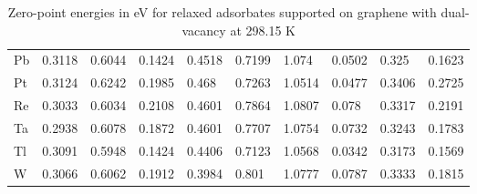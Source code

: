 \begin{table}[h]
{\begin{tabular}{*{10}{l}}
      Pb & 0.3118 & 0.6044 & 0.1424 & 0.4518 & 0.7199 & 1.074  & 0.0502 & 0.325  & 0.1623 \\
      Pt & 0.3124 & 0.6242 & 0.1985 & 0.468  & 0.7263 & 1.0514 & 0.0477 & 0.3406 & 0.2725 \\
      Re & 0.3033 & 0.6034 & 0.2108 & 0.4601 & 0.7864 & 1.0807 & 0.078  & 0.3317 & 0.2191 \\
      Ta & 0.2938 & 0.6078 & 0.1872 & 0.4601 & 0.7707 & 1.0754 & 0.0732 & 0.3243 & 0.1783 \\
      Tl & 0.3091 & 0.5948 & 0.1424 & 0.4406 & 0.7123 & 1.0568 & 0.0342 & 0.3173 & 0.1569 \\
      W  & 0.3066 & 0.6062 & 0.1912 & 0.3984 & 0.801  & 1.0777 & 0.0787 & 0.3333 & 0.1815 \\
      \hline
  \end{tabular}
  }
  \caption{Zero-point energies in eV for relaxed adsorbates supported on graphene with dual-vacancy at 298.15 K}
  \label{si_table11}
\end{table}


